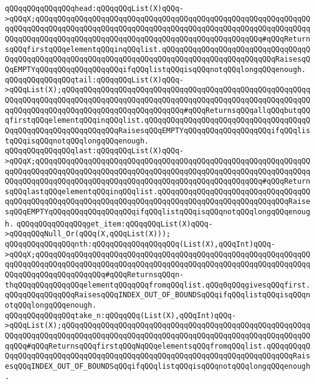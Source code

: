 \verb|qQQqqQQqqQQqqQQqhead:qQQqqQQqList(X)qQQq->qQQqX;qQQqqQQqqQQqqQQqqQQqqQQqqQQqqQQqqQQqqQQqqQQqqQQqqQQqqQQqqQQqqQQqqQQqqQQqqQQqqQQqqQQqqQQqqQQqqQQqqQQqqQQqqQQqqQQqqQQqqQQqqQQqqQQqqQQqqQQqqQQqqQQqqQQqqQQqqQQqqQQqqQQqqQQqqQQqqQQqqQQqqQQqqQQqqQQq#qQQqReturnsqQQqfirstqQQqelementqQQqinqQQqlist.qQQqqQQqqQQqqQQqqQQqqQQqqQQqqQQqqQQqqQQqqQQqqQQqqQQqqQQqqQQqqQQqqQQqqQQqqQQqqQQqqQQqqQQqqQQqqQQqRaisesqQQqEMPTYqQQqqQQqqQQqqQQqqQQqifqQQqlistqQQqisqQQqnotqQQqlongqQQqenough.|\newline
\verb|qQQqqQQqqQQqqQQqtail:qQQqqQQqList(X)qQQq->qQQqList(X);qQQqqQQqqQQqqQQqqQQqqQQqqQQqqQQqqQQqqQQqqQQqqQQqqQQqqQQqqQQqqQQqqQQqqQQqqQQqqQQqqQQqqQQqqQQqqQQqqQQqqQQqqQQqqQQqqQQqqQQqqQQqqQQqqQQqqQQqqQQqqQQqqQQqqQQqqQQqqQQqqQQqqQQq#qQQqReturnsqQQqallqQQqbutqQQqfirstqQQqelementqQQqinqQQqlist.qQQqqQQqqQQqqQQqqQQqqQQqqQQqqQQqqQQqqQQqqQQqqQQqqQQqqQQqqQQqqQQqRaisesqQQqEMPTYqQQqqQQqqQQqqQQqqQQqifqQQqlistqQQqisqQQqnotqQQqlongqQQqenough.|\newline
\verb|qQQqqQQqqQQqqQQqlast:qQQqqQQqList(X)qQQq->qQQqX;qQQqqQQqqQQqqQQqqQQqqQQqqQQqqQQqqQQqqQQqqQQqqQQqqQQqqQQqqQQqqQQqqQQqqQQqqQQqqQQqqQQqqQQqqQQqqQQqqQQqqQQqqQQqqQQqqQQqqQQqqQQqqQQqqQQqqQQqqQQqqQQqqQQqqQQqqQQqqQQqqQQqqQQqqQQqqQQqqQQqqQQqqQQqqQQq#qQQqReturnsqQQqlastqQQqelementqQQqinqQQqlist.qQQqqQQqqQQqqQQqqQQqqQQqqQQqqQQqqQQqqQQqqQQqqQQqqQQqqQQqqQQqqQQqqQQqqQQqqQQqqQQqqQQqqQQqqQQqqQQqqQQqRaisesqQQqEMPTYqQQqqQQqqQQqqQQqqQQqifqQQqlistqQQqisqQQqnotqQQqlongqQQqenough.|\newline
\newline
\verb|qQQqqQQqqQQqqQQqget_item:qQQqqQQqList(X)qQQq->qQQqqQQqNull_Or(qQQq(X,qQQqList(X)));|\newline
\newline
\verb|qQQqqQQqqQQqqQQqnth:qQQqqQQqqQQqqQQqqQQq(List(X),qQQqInt)qQQq->qQQqX;qQQqqQQqqQQqqQQqqQQqqQQqqQQqqQQqqQQqqQQqqQQqqQQqqQQqqQQqqQQqqQQqqQQqqQQqqQQqqQQqqQQqqQQqqQQqqQQqqQQqqQQqqQQqqQQqqQQqqQQqqQQqqQQqqQQqqQQqqQQqqQQqqQQqqQQqqQQq#qQQqReturnsqQQqn-thqQQqqQQqqQQqqQQqelementqQQqqQQqfromqQQqlist.qQQq0qQQqgivesqQQqfirst.qQQqqQQqqQQqqQQqRaisesqQQqINDEX_OUT_OF_BOUNDSqQQqifqQQqlistqQQqisqQQqnotqQQqlongqQQqenough.|\newline
\verb|qQQqqQQqqQQqqQQqtake_n:qQQqqQQq(List(X),qQQqInt)qQQq->qQQqList(X);qQQqqQQqqQQqqQQqqQQqqQQqqQQqqQQqqQQqqQQqqQQqqQQqqQQqqQQqqQQqqQQqqQQqqQQqqQQqqQQqqQQqqQQqqQQqqQQqqQQqqQQqqQQqqQQqqQQqqQQqqQQqqQQqqQQq#qQQqReturnsqQQqfirstqQQqNqQQqelementsqQQqfromqQQqlist.qQQqqQQqqQQqqQQqqQQqqQQqqQQqqQQqqQQqqQQqqQQqqQQqqQQqqQQqqQQqqQQqqQQqqQQqqQQqRaisesqQQqINDEX_OUT_OF_BOUNDSqQQqifqQQqlistqQQqisqQQqnotqQQqlongqQQqenough.|\newline
